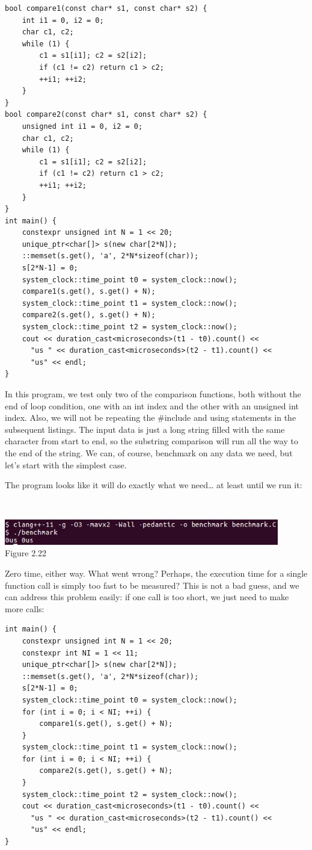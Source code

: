 \begin{lstlisting}[style=styleCXX]
bool compare1(const char* s1, const char* s2) {
	int i1 = 0, i2 = 0;
	char c1, c2;
	while (1) {
		c1 = s1[i1]; c2 = s2[i2];
		if (c1 != c2) return c1 > c2;
		++i1; ++i2;
	}
}
bool compare2(const char* s1, const char* s2) {
	unsigned int i1 = 0, i2 = 0;
	char c1, c2;
	while (1) {
		c1 = s1[i1]; c2 = s2[i2];
		if (c1 != c2) return c1 > c2;
		++i1; ++i2;
	}
}
int main() {
	constexpr unsigned int N = 1 << 20;
	unique_ptr<char[]> s(new char[2*N]);
	::memset(s.get(), 'a', 2*N*sizeof(char));
	s[2*N-1] = 0;
	system_clock::time_point t0 = system_clock::now();
	compare1(s.get(), s.get() + N);
	system_clock::time_point t1 = system_clock::now();
	compare2(s.get(), s.get() + N);
	system_clock::time_point t2 = system_clock::now();
	cout << duration_cast<microseconds>(t1 - t0).count() <<
	  "us " << duration_cast<microseconds>(t2 - t1).count() <<
	  "us" << endl;
}
\end{lstlisting}

In this program, we test only two of the comparison functions, both without the end of loop condition, one with an int index and the other with an unsigned int index. Also, we will not be repeating the \#include and using statements in the subsequent listings. The input data is just a long string filled with the same character from start to end, so the substring comparison will run all the way to the end of the string. We can, of course, benchmark on any data we need, but let's start with the simplest case.

The program looks like it will do exactly what we need… at least until we run it:

\hspace*{\fill} \\ %
\begin{center}
\includegraphics[width=0.9\textwidth]{content/1/chapter2/images/22.jpg}\\
Figure 2.22
\end{center}

Zero time, either way. What went wrong? Perhaps, the execution time for a single function call is simply too fast to be measured? This is not a bad guess, and we can address this problem easily: if one call is too short, we just need to make more calls:

\begin{lstlisting}[style=styleCXX]
int main() {
	constexpr unsigned int N = 1 << 20;
	constexpr int NI = 1 << 11;
	unique_ptr<char[]> s(new char[2*N]);
	::memset(s.get(), 'a', 2*N*sizeof(char));
	s[2*N-1] = 0;
	system_clock::time_point t0 = system_clock::now();
	for (int i = 0; i < NI; ++i) {
		compare1(s.get(), s.get() + N);
	}
	system_clock::time_point t1 = system_clock::now();
	for (int i = 0; i < NI; ++i) {
		compare2(s.get(), s.get() + N);
	}
	system_clock::time_point t2 = system_clock::now();
	cout << duration_cast<microseconds>(t1 - t0).count() <<
	  "us " << duration_cast<microseconds>(t2 - t1).count() <<
	  "us" << endl;
}
\end{lstlisting}

